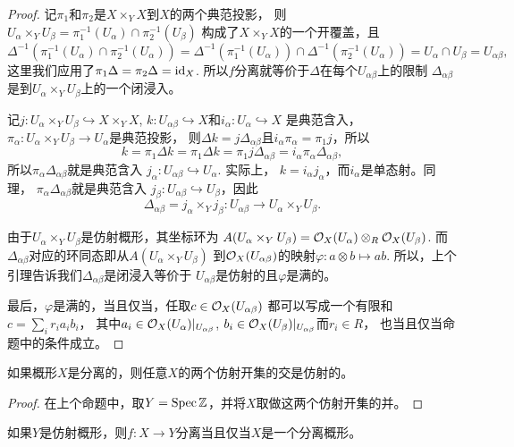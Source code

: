 \begin{proof}
记$\pi_1$和$\pi_2$是$X\times_Y X$到$X$的两个典范投影，
则$U_\alpha\times_Y U_\beta=\pi_1^{-1}(U_\alpha)\cap\pi_2^{-1}(U_\beta)$
构成了$X\times_Y X$的一个开覆盖，且
\[
	\Delta^{-1}\left(\pi_1^{-1}(U_\alpha)\cap\pi_2^{-1}(U_\alpha)\right)=
	\Delta^{-1}\left(\pi_1^{-1}(U_\alpha)\right)\cap\Delta^{-1}
	\left(\pi_2^{-1}(U_\alpha)\right)=U_\alpha\cap U_\beta=U_{\alpha\beta},
\]
这里我们应用了$\pi_1\Delta=\pi_2\Delta=\operatorname{id}_X$. 
所以$f$分离就等价于$\Delta$在每个$U_{\alpha\beta}$上的限制
$\Delta_{\alpha\beta}$是到$U_\alpha\times_Y U_\beta$上的一个闭浸入。

记$j:U_\alpha\times_Y U_\beta\hookrightarrow X \times_Y X$, 
$k:U_{\alpha\beta}\hookrightarrow X$和$i_\alpha:U_\alpha\hookrightarrow X$
是典范含入，$\pi_\alpha:U_\alpha\times_Y U_\beta\to U_\alpha$是典范投影，
则$\Delta k=j\Delta_{\alpha\beta}$且$i_\alpha\pi_\alpha=\pi_1j$，所以
\[
	k=\pi_1\Delta k=\pi_1\Delta k=\pi_1j\Delta_{\alpha\beta}=
	i_\alpha\pi_\alpha\Delta_{\alpha\beta},
\]
所以$\pi_\alpha\Delta_{\alpha\beta}$就是典范含入
$j_\alpha:U_{\alpha\beta}\hookrightarrow U_\alpha$. 实际上，
$k=i_\alpha j_\alpha$，而$i_\alpha$是单态射。同理，
$\pi_\alpha\Delta_{\alpha\beta}$就是典范含入
$j_\beta:U_{\alpha\beta}\hookrightarrow U_\beta$，因此
\[
	\Delta_{\alpha\beta}=j_\alpha\times_Y j_\beta:
	U_{\alpha\beta}\to U_\alpha\times_Y U_\beta.
\]

由于$U_\alpha\times_Y U_\beta$是仿射概形，其坐标环为
$A(U_\alpha\times_Y U_\beta)=\mathcal{O}_X(U_\alpha)\otimes_{R}\mathcal{O}_X(U_\beta)$.
而$\Delta_{\alpha\beta}$对应的环同态即从$A(U_\alpha\times_Y U_\beta)$
到$\mathcal{O}_X(U_{\alpha\beta})$的映射$\varphi:a\otimes b\mapsto ab$. 
所以，上个引理告诉我们$\Delta_{\alpha\beta}$是闭浸入等价于
$U_{\alpha\beta}$是仿射的且$\varphi$是满的。

最后，$\varphi$是满的，当且仅当，任取$c\in \mathcal{O}_X(U_{\alpha\beta})$
都可以写成一个有限和$c=\sum_{i}r_ia_ib_i$，
其中$a_i\in \mathcal{O}_X(U_\alpha)|_{U_{\alpha\beta}}$, 
$b_i\in \mathcal{O}_X(U_\beta)|_{U_{\alpha\beta}}$而$r_i\in R$，
也当且仅当命题中的条件成立。
\end{proof}

\begin{coro}
	如果概形$X$是分离的，则任意$X$的两个仿射开集的交是仿射的。
\end{coro}

\begin{proof}
	在上个命题中，取$Y=\operatorname{Spec} \mathbb{Z}$，并将$X$取做这两个仿射开集的并。
\end{proof}

\begin{coro}
如果$Y$是仿射概形，则$f:X\to Y$分离当且仅当$X$是一个分离概形。
\end{coro}

